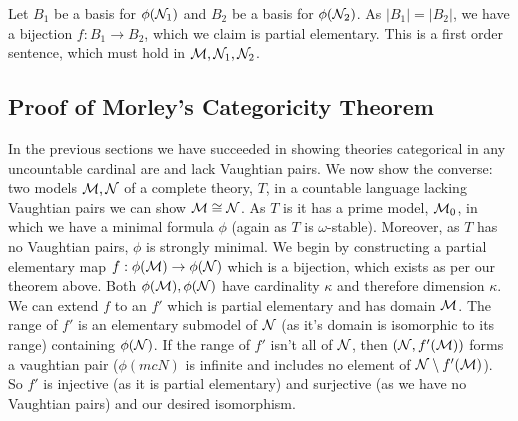 Let \(B_1\) be a basis for \(\phi(\mathcal{N}_1)\) and \(B_2\) be a basis for \(\phi(\mathcal{N}_2)\).
As \(|B_1| = |B_2|\), we have a bijection \(f: B_1 \to B_2\), which we claim is partial elementary. 
This is a first order sentence, which must hold in \(\mathcal{M}, \mathcal{N}_1, \mathcal{N}_2\). 

\subsection{Proof of Morley's Categoricity Theorem}

In the previous sections we have succeeded in showing theories categorical in any uncountable cardinal are \omst and lack Vaughtian pairs. 
We now show the converse: two models \(\mathcal{M}, \mathcal{N}\)  of a complete \omst theory, \(T\), in a countable language lacking Vaughtian pairs we can show \(\mathcal{M} \cong \mathcal{N}\). 
As \(T\) is \omst it has a prime model, \(\mathcal{M}_0\), in which we have a minimal formula \(\phi\) (again as \(T\) is \(\omega\)-stable).
Moreover, as \(T\) has no Vaughtian pairs, \(\phi\) is strongly minimal. 
We begin by constructing a partial elementary map \(f:\phi(\mathcal{M}) \to \phi(\mathcal{N})\) which is a bijection, which exists as per our theorem above.
Both \(\phi(\mathcal{M}), \phi(\mathcal{N})\) have cardinality \(\kappa\) and therefore dimension \(\kappa\). 
We can extend \(f\) to an \(f'\) which is partial elementary and has domain \(\mathcal{M}\). 
The range of \(f'\) is an elementary submodel of \(\mathcal{N}\) (as it's domain is isomorphic to its range) containing \(\phi(\mathcal{N})\). 
If the range of \(f'\) isn't all of \(\mathcal{N}\), then \((\mathcal{N}, f'(\mathcal{M}))\) forms a vaughtian pair (\(\phi(mcN)\) is infinite and includes no element of \(\mathcal{N} \setminus f'(\mathcal{M})\)).  
So \(f'\) is injective (as it is partial elementary) and surjective (as we have no Vaughtian pairs) and our desired isomorphism. 


